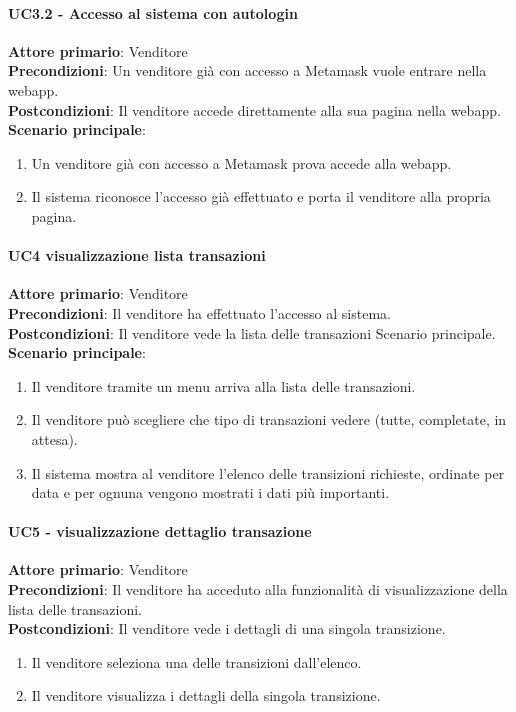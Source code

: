 \documentclass[a4paper, 12pt]{article}
\begin{document}
\paragraph{UC3.2 - Accesso al sistema con autologin}
\textbf{Attore primario}: Venditore\\
\textbf{Precondizioni}: Un venditore già con accesso a Metamask vuole entrare nella webapp.\\
\textbf{Postcondizioni}: Il venditore accede direttamente alla sua pagina nella webapp.\\
\textbf{Scenario principale}:
\begin{enumerate}
\item Un venditore già con accesso a Metamask prova accede alla webapp.
\item Il sistema riconosce l'accesso già effettuato e porta il venditore alla propria pagina.
\end{enumerate}

\paragraph{UC4 visualizzazione lista transazioni}
\textbf{Attore primario}: Venditore \\
\textbf{Precondizioni}: Il venditore ha effettuato l'accesso al sistema.\\
\textbf{Postcondizioni}:  Il venditore vede la lista delle transazioni
Scenario principale.\\
\textbf{Scenario principale}:
\begin{enumerate}
\item Il venditore tramite un menu arriva alla lista delle transazioni.
\item Il venditore può scegliere che tipo di transazioni vedere (tutte, completate, in attesa).
\item Il sistema mostra al venditore l'elenco delle transizioni richieste, ordinate per data e per ognuna vengono mostrati i dati più importanti.
\end{enumerate}

\paragraph{UC5 - visualizzazione dettaglio transazione}
\textbf{Attore primario}: Venditore\\
\textbf{Precondizioni}: Il venditore ha acceduto alla funzionalità di visualizzazione della lista delle transazioni.\\
\textbf{Postcondizioni}: Il venditore vede i dettagli di una singola transizione.\\
\begin{enumerate}
\item Il venditore seleziona una delle transizioni dall'elenco.
\item Il venditore visualizza i dettagli della singola transizione.
\end{enumerate}
\end{document}
